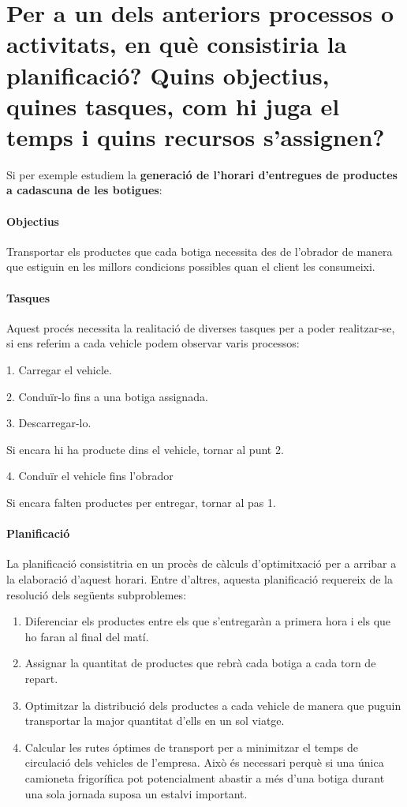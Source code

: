 \section{Per a un dels anteriors processos o activitats, en què consistiria la planificació? Quins objectius, quines
tasques, com hi juga el temps i quins recursos s’assignen?}

Si per exemple estudiem la \textbf{generació de l'horari d'entregues de productes a cadascuna de les botigues}:

\paragraph{Objectius} Transportar els productes que cada botiga necessita des de l'obrador de manera que estiguin en les millors condicions possibles quan el client les consumeixi.

\paragraph{Tasques} Aquest procés necessita la realitació de diverses tasques per a poder realitzar-se, si ens referim a cada vehicle podem observar varis processos:

\begin{enumerate*}
  \item[1.] Carregar el vehicle.
  \item[2.] Conduïr-lo fins a una botiga assignada.
  \item[3.] Descarregar-lo.
  \item[] Si encara hi ha producte dins el vehicle, tornar al punt 2.
  \item[4.] Conduïr el vehicle fins l'obrador
  \item[] Si encara falten productes per entregar, tornar al pas 1.
\end{enumerate*}

\paragraph{Planificació} La planificació consistitria en un procès de càlculs d'optimitxació per a arribar a la elaboració d'aquest horari. Entre d'altres, aquesta planificació requereix de la resolució dels següents subproblemes:

\begin{enumerate}
  \item Diferenciar els productes entre els que s'entregaràn a primera hora i els que ho faran al final del matí.
  \item Assignar la quantitat de productes que rebrà cada botiga a cada torn de repart.
  \item Optimitzar la distribució dels productes a cada vehicle de manera que puguin transportar la major quantitat d'ells en un sol viatge.
  \item Calcular les rutes óptimes de transport per a minimitzar el temps de circulació dels vehicles de l'empresa. Això és necessari perquè si una única camioneta frigorífica pot potencialment abastir a més d'una botiga durant una sola jornada suposa un estalvi important.
\end{enumerate}

